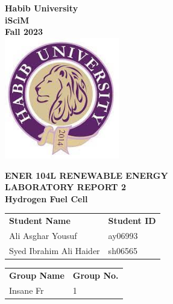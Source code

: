 \documentclass[a4paper, 12pt, english]{article}
\begin{document}
\begin{titlepage}
    \begin{center}
        \textbf{\LARGE Habib University}\\[0.5cm]
        \textbf{\large iSciM}\\[0.2cm]
        \textbf {\large Fall 2023}\\[0.2cm]
        \vspace{20pt}
        \includegraphics[width=5cm]{../habiblogo.jpg}\\[1cm]
        \par
        \vspace{20pt}
        \textbf{\Large ENER 104L RENEWABLE ENERGY}\\
        \vspace{15pt}
        \myrule[1pt][7pt]
        \textbf{\LARGE  LABORATORY REPORT 2}\\
        \vspace{15pt}
        \textbf{\large Hydrogen Fuel Cell}\\
        \myrule[1pt][7pt]
        \vspace{25pt}
        \begin{tabular}{@{}p{5cm}p{3cm}@{}}
            \textbf{\large Student Name} & \textbf{\large Student ID} \\
            Ali Asghar Yousuf            & ay06993                    \\ %
            Syed Ibrahim Ali Haider      & sh06565                    \\ %
        \end{tabular}

        \vspace{10pt}
        \begin{tabular}{@{}p{5cm}p{3cm}@{}}
            \textbf{\large Group Name} & \textbf{\large Group No.} \\
            Insane Fr                  & 1                         \\
        \end{tabular}


\end{center}
\end{titlepage}
\end{document}
